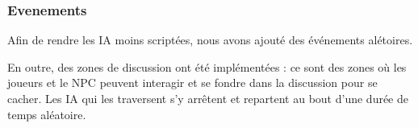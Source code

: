    
    \subsubsection{Evenements}

    Afin de rendre les IA moins scriptées, nous avons ajouté des événements alétoires.
    
    En outre, des zones de discussion ont été implémentées : ce sont des zones où les joueurs et le NPC peuvent interagir 
    et se fondre dans la discussion pour se cacher. Les IA qui les traversent s'y arrêtent et repartent au bout d'une durée 
    de temps aléatoire. 